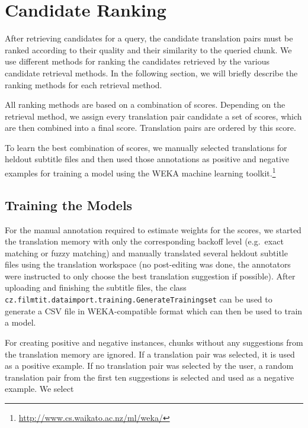 \section{Candidate Ranking}
\label{sec:ranking}

After retrieving candidates for a query, the candidate translation pairs must be ranked according to their quality and their similarity to the queried chunk. We use different methods for ranking the candidates retrieved by the various candidate retrieval methods. In the following section, we will briefly describe the ranking methods for each retrieval method.

All ranking methods are based on a combination of scores. Depending on the retrieval method, we assign every translation pair candidate a set of scores, which are then combined into a final score. Translation pairs are ordered by this score.

To learn the best combination of scores, we manually selected translations for heldout subtitle files and then used those annotations as positive and negative examples for training a model using the WEKA machine learning toolkit.\footnote{\url{http://www.cs.waikato.ac.nz/ml/weka/}}

\subsection{Training the Models}

For the manual annotation required to estimate weights for the scores, we started the translation memory with only the corresponding backoff level (e.g.\ exact matching or fuzzy matching) and manually translated several heldout subtitle files using the translation workspace (no post-editing was done, the annotators were instructed to only choose the best translation suggestion if possible). After uploading and finishing the subtitle files, the class {\tt cz.filmtit.dataimport.training.GenerateTrainingset} can be used to generate a CSV file in WEKA-compatible format which can then be used to train a model.

For creating positive and negative instances, chunks without any suggestions from the translation memory are ignored. If a translation pair was selected, it is used as a positive example. If no translation pair was selected by the user, a random translation pair from the first ten suggestions is selected and used as a negative example. We select 


